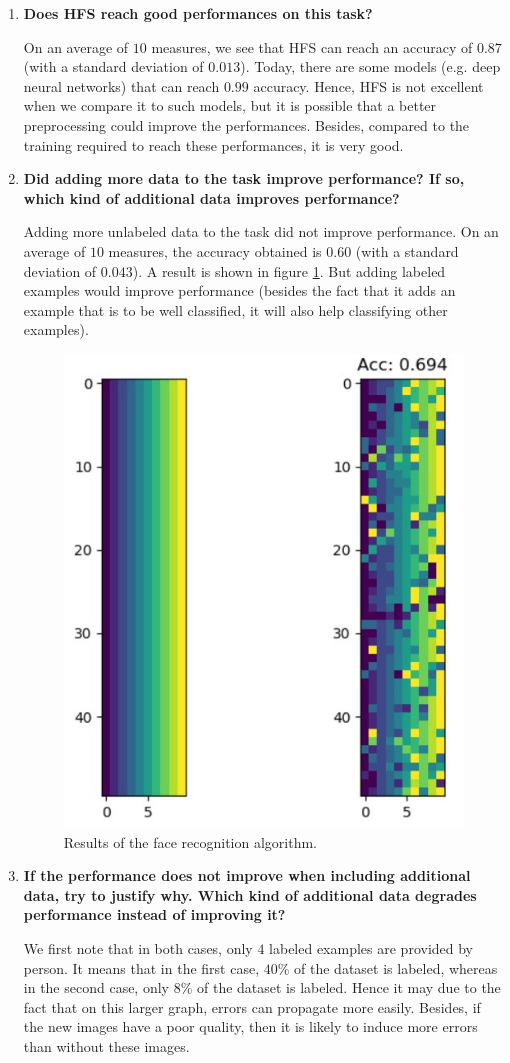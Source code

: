 \documentclass[a4paper, 11pt]{article}
\begin{document}
\begin{enumerate}
	\item \textbf{Does HFS reach good performances on this task?}
	
	On an average of $10$ measures, we see that HFS can reach an accuracy of $0.87$ (with a standard deviation of $0.013$). Today, there are some models (e.g. deep neural networks) that can reach $0.99$ accuracy. Hence, HFS is not excellent when we compare it to such models, but it is possible that a better preprocessing could improve the performances. Besides, compared to the training required to reach these performances, it is very good.
	
	\item \textbf{Did adding more data to the task improve performance? If so, which kind of additional data improves performance?}
	
	Adding more unlabeled data to the task did not improve performance. On an average of $10$ measures, the accuracy obtained is $0.60$ (with a standard deviation of $0.043$). A result is shown in figure \ref{fig:q24-results}. But adding labeled examples would improve performance (besides the fact that it adds an example that is to be well classified, it will also help classifying other examples).

	\begin{figure}[!htb]
	    \centering
	    \includegraphics[width=.3\textwidth]{images/q24_results}
	    \caption{Results of the face recognition algorithm.}
	    \label{fig:q24-results}
	\end{figure}
	
	\item \textbf{If the performance does not improve when including additional data, try to justify why. Which kind of additional data degrades performance instead of improving it?}
	
	We first note that in both cases, only $4$ labeled examples are provided by person. It means that in the first case, $40\%$ of the dataset is labeled, whereas in the second case, only $8\%$ of the dataset is labeled. Hence it may due to the fact that on this larger graph, errors can propagate more easily. Besides, if the new images have a poor quality, then it is likely to induce more errors than without these images.
	
\end{enumerate}
\end{document}
